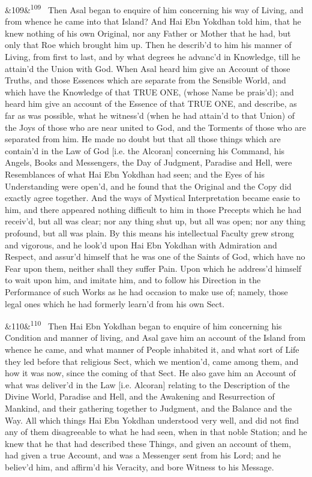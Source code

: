 \documentclass[12pt]{article}
\newcommand{\para}[1][]{\par\noindent\ifx&#1&\else\textsuperscript{\footnotesize #1}~\fi}
\begin{document}
\para[109] Then Asal began to enquire of him concerning his way of Living, and from whence he came into that Island? And Hai Ebn Yokdhan told him, that he knew nothing of his own Original, nor any Father or Mother that he had, but only that Roe which brought him up. Then he describ'd to him his manner of Living, from first to last, and by what degrees he advanc'd in Knowledge, till he attain'd the Union with God. When Asal heard him give an Account of those Truths, and those Essences which are separate from the Sensible World, and which have the Knowledge of that TRUE ONE, (whose Name be prais'd); and heard him give an account of the Essence of that TRUE ONE, and describe, as far as was possible, what he witness'd (when he had attain'd to that Union) of the Joys of those who are near united to God, and the Torments of those who are separated from him. He made no doubt but that all those things which are contain'd in the Law of God [i.e. the Alcoran] concerning his Command, his Angels, Books and Messengers, the Day of Judgment, Paradise and Hell, were Resemblances of what Hai Ebn Yokdhan had seen; and the Eyes of his Understanding were open'd, and he found that the Original and the Copy did exactly agree together. And the ways of Mystical Interpretation became easie to him, and there appeared nothing difficult to him in those Precepts which he had receiv'd, but all was clear; nor any thing shut up, but all was open; nor any thing profound, but all was plain. By this means his intellectual Faculty grew strong and vigorous, and he look'd upon Hai Ebn Yokdhan with Admiration and Respect, and assur'd himself that he was one of the Saints of God, which have no Fear upon them, neither shall they suffer Pain. Upon which he address'd himself to wait upon him, and imitate him, and to follow his Direction in the Performance of such Works as he had occasion to make use of; namely, those legal ones which he had formerly learn'd from his own Sect.

\para[110] Then Hai Ebn Yokdhan began to enquire of him concerning his Condition and manner of living, and Asal gave him an account of the Island from whence he came, and what manner of People inhabited it, and what sort of Life they led before that religious Sect, which we mention'd, came among them, and how it was now, since the coming of that Sect. He also gave him an Account of what was deliver'd in the Law [i.e. Alcoran] relating to the Description of the Divine World, Paradise and Hell, and the Awakening and Resurrection of Mankind, and their gathering together to Judgment, and the Balance and the Way. All which things Hai Ebn Yokdhan understood very well, and did not find any of them disagreeable to what he had seen, when in that noble Station; and he knew that he that had described these Things, and given an account of them, had given a true Account, and was a Messenger sent from his Lord; and he believ'd him, and affirm'd his Veracity, and bore Witness to his Message.
\end{document}
